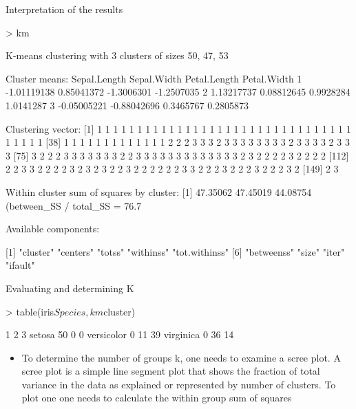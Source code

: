 \documentclass[10pt]{beamer}
\begin{document}
\begin{frame}[fragile]{Interpretation of the results}
\begin{Schunk}
\begin{Sinput}
> km
\end{Sinput}
\begin{Soutput}
K-means clustering with 3 clusters of sizes 50, 47, 53

Cluster means:
  Sepal.Length Sepal.Width Petal.Length Petal.Width
1  -1.01119138  0.85041372   -1.3006301  -1.2507035
2   1.13217737  0.08812645    0.9928284   1.0141287
3  -0.05005221 -0.88042696    0.3465767   0.2805873

Clustering vector:
  [1] 1 1 1 1 1 1 1 1 1 1 1 1 1 1 1 1 1 1 1 1 1 1 1 1 1 1 1 1 1 1 1 1 1 1 1 1 1
 [38] 1 1 1 1 1 1 1 1 1 1 1 1 1 2 2 2 3 3 3 2 3 3 3 3 3 3 3 3 2 3 3 3 3 2 3 3 3
 [75] 3 2 2 2 3 3 3 3 3 3 3 2 2 3 3 3 3 3 3 3 3 3 3 3 3 3 2 3 2 2 2 2 3 2 2 2 2
[112] 2 2 3 3 2 2 2 2 3 2 3 2 3 2 2 3 2 2 2 2 2 2 3 3 2 2 2 3 2 2 2 3 2 2 2 3 2
[149] 2 3

Within cluster sum of squares by cluster:
[1] 47.35062 47.45019 44.08754
 (between_SS / total_SS =  76.7 %)

Available components:

[1] "cluster"      "centers"      "totss"        "withinss"     "tot.withinss"
[6] "betweenss"    "size"         "iter"         "ifault"      
\end{Soutput}
\end{Schunk}
\end{frame}

\begin{frame}[fragile]{Evaluating  and determining K}
\begin{Schunk}
\begin{Sinput}
> table(iris$Species,km$cluster)
\end{Sinput}
\begin{Soutput}
              1  2  3
  setosa     50  0  0
  versicolor  0 11 39
  virginica   0 36 14
\end{Soutput}
\end{Schunk}
\begin{block}{}
\begin{itemize}
\item To determine the number of groups k, one needs to examine a scree plot. A scree plot is a simple line segment plot that shows the fraction of total variance in the data as explained or represented by number of clusters.
To plot one one needs to calculate the within group sum of squares
\end{itemize}
\end{block}
\end{frame}
\end{document}
